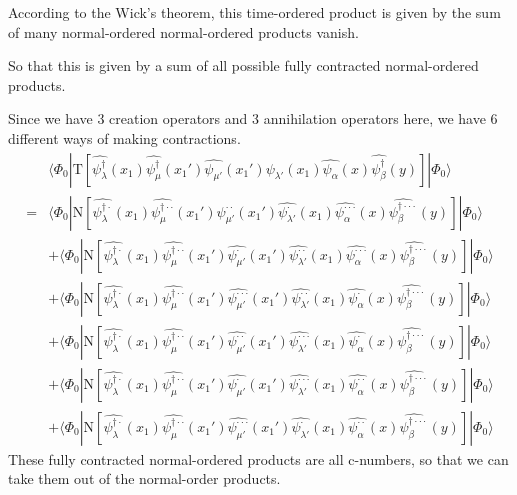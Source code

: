 According to the Wick's theorem, this time-ordered product is given by the sum of many normal-ordered normal-ordered products vanish.

So that this is given by a sum of all possible fully contracted normal-ordered products.

 Since we have 3 creation operators and 3 annihilation operators here, we have 6 different ways of making contractions.
\begin{align}
&\langle \Phi_0|\mathrm{T}[\hat{\psi_{\lambda}^{\dagger}}(x_1)\hat{\psi_{\mu}^{\dagger}}(x_1')\hat{\psi_{\mu'}}(x_1')\hat{\psi_{\lambda'}}(x_1)\hat{\psi_{\alpha}}(x)\hat{\psi_{\beta}^{\dagger}}(y)]|\Phi_0\rangle \nonumber \\
=&\langle\Phi_0|\mathrm{N}[\hat{\psi_{\lambda}^{\dagger\cdot}}(x_1)\hat{\psi_{\mu}^{\dagger\cdot\cdot}}(x_1')\hat{\psi_{\mu'}^{\cdot\cdot}}(x_1')\hat{\psi_{\lambda'}^{\cdot}}(x_1)\hat{\psi_{\alpha}^{\cdot\cdot\cdot}}(x)\hat{\psi_{\beta}^{\dagger\cdot\cdot\cdot}}(y)]|\Phi_0\rangle \nonumber \\
&+\langle\Phi_0|\mathrm{N}[\hat{\psi_{\lambda}^{\dagger\cdot}}(x_1)\hat{\psi_{\mu}^{\dagger\cdot\cdot}}(x_1')\hat{\psi_{\mu'}^{\cdot}}(x_1')\hat{\psi_{\lambda'}^{\cdot\cdot}}(x_1)\hat{\psi_{\alpha}^{\cdot\cdot\cdot}}(x)\hat{\psi_{\beta}^{\dagger\cdot\cdot\cdot}}(y)]|\Phi_0\rangle \nonumber \\
&+\langle\Phi_0|\mathrm{N}[\hat{\psi_{\lambda}^{\dagger\cdot}}(x_1)\hat{\psi_{\mu}^{\dagger\cdot\cdot}}(x_1')\hat{\psi_{\mu'}^{\cdot\cdot\cdot}}(x_1')\hat{\psi_{\lambda'}^{\cdot\cdot}}(x_1)\hat{\psi_{\alpha}^{\cdot}}(x)\hat{\psi_{\beta}^{\dagger\cdot\cdot\cdot}}(y)]|\Phi_0\rangle \nonumber \\
&+\langle\Phi_0|\mathrm{N}[\hat{\psi_{\lambda}^{\dagger\cdot}}(x_1)\hat{\psi_{\mu}^{\dagger\cdot\cdot}}(x_1')\hat{\psi_{\mu'}^{\cdot\cdot}}(x_1')\hat{\psi_{\lambda'}^{\cdot\cdot\cdot}}(x_1)\hat{\psi_{\alpha}^{\cdot}}(x)\hat{\psi_{\beta}^{\dagger\cdot\cdot\cdot}}(y)]|\Phi_0\rangle \nonumber \\
&+\langle\Phi_0|\mathrm{N}[\hat{\psi_{\lambda}^{\dagger\cdot}}(x_1)\hat{\psi_{\mu}^{\dagger\cdot\cdot}}(x_1')\hat{\psi_{\mu'}^{\cdot}}(x_1')\hat{\psi_{\lambda'}^{\cdot\cdot\cdot}}(x_1)\hat{\psi_{\alpha}^{\cdot\cdot}}(x)\hat{\psi_{\beta}^{\dagger\cdot\cdot\cdot}}(y)]|\Phi_0\rangle \nonumber \\
&+\langle\Phi_0|\mathrm{N}[\hat{\psi_{\lambda}^{\dagger\cdot}}(x_1)\hat{\psi_{\mu}^{\dagger\cdot\cdot}}(x_1')\hat{\psi_{\mu'}^{\cdot\cdot\cdot}}(x_1')\hat{\psi_{\lambda'}^{\cdot}}(x_1)\hat{\psi_{\alpha}^{\cdot\cdot}}(x)\hat{\psi_{\beta}^{\dagger\cdot\cdot\cdot}}(y)]|\Phi_0\rangle \nonumber
\end{align}
These fully contracted normal-ordered products are all c-numbers, so that we can take them out of  the normal-order products.

